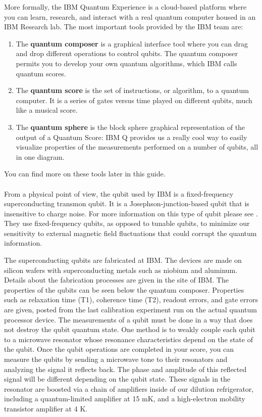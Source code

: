 \documentclass[a4paper,10pt]{article}
\begin{document}
More formally, the IBM Quantum Experience is a cloud-based platform where you can learn, research, and interact with a real quantum computer housed in an IBM Research lab. The most important tools provided by the IBM team are:
\begin{enumerate}
    \item The \textbf{quantum composer} is a graphical interface tool where you can drag and drop different operations to control qubits. The quantum composer permits you to develop your own quantum algorithms, which IBM calls quantum scores.
    \item The \textbf{quantum score} is the set of instructions, or algorithm, to a quantum computer. It is a series of gates versus time played on different qubits, much like a musical score.
    \item The \textbf{quantum sphere} is the block sphere graphical representation of the output of a Quantum Score: IBM Q provides us a really cool way to easily visualize properties of the measurements performed on a number of qubits, all in one diagram.
\end{enumerate}

You can find more on these tools later in this guide.

\paragraph{} From a physical point of view, the qubit used by IBM is a fixed-frequency superconducting transmon qubit. It is a Josephson-junction-based qubit that is insensitive to charge noise. For more information on this type of qubit please see \cite{PhysRevA.76.042319}. They use fixed-frequency qubits, as opposed to tunable qubits, to minimize our sensitivity to external magnetic field fluctuations that could corrupt the quantum information.

The superconducting qubits are fabricated at IBM. The devices are made on silicon wafers with superconducting metals such as niobium and aluminum. Details about the fabrication processes are given in the site of IBM. The properties of the qubits can be seen below the quantum composer. Properties such as relaxation time (T1), coherence time (T2), readout errors, and gate errors are given, posted from the last calibration experiment run on the actual quantum processor device. 
The measurements of a qubit must be done in a way that does not destroy the qubit quantum state. One method is to weakly couple each qubit to a microwave resonator whose resonance characteristics depend on the state of the qubit. Once the qubit operations are completed in your score, you can measure the qubits by sending a microwave tone to their resonators and analyzing the signal it reflects back. The phase and amplitude of this reflected signal will be different depending on the qubit state. These signals in the resonator are boosted via a chain of amplifiers inside of our dilution refrigerator, including a quantum-limited amplifier at 15 mK, and a high-electron mobility transistor amplifier at 4 K.
\end{document}
